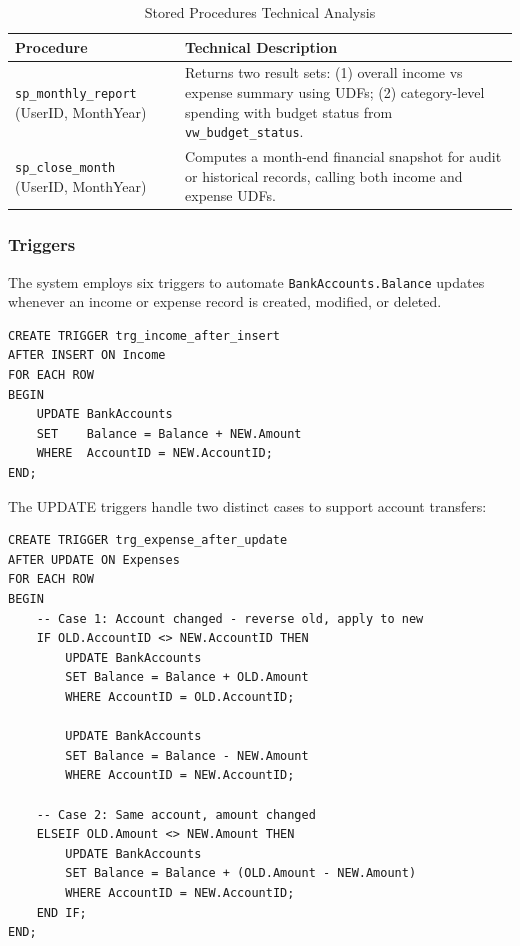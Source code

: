 \documentclass[12pt, a4paper]{article}
\begin{document}
\begin{table}[H]
\centering
\caption{Stored Procedures Technical Analysis}
\label{tab:procedures}
\begin{tabularx}{\textwidth}{>{\raggedright\arraybackslash}p{4.5cm} X}
\toprule
\textbf{Procedure} & \textbf{Technical Description} \\
\midrule
\texttt{sp\_monthly\_report} \newline \footnotesize (UserID, MonthYear)
  & Returns two result sets: (1) overall income vs expense summary using UDFs;
    (2) category-level spending with budget status from \texttt{vw\_budget\_status}. \\
\addlinespace
\texttt{sp\_close\_month} \newline \footnotesize (UserID, MonthYear)
  & Computes a month-end financial snapshot for audit or historical records,
    calling both income and expense UDFs. \\
\bottomrule
\end{tabularx}
\end{table}

\subsubsection{Triggers}

The system employs six triggers to automate \texttt{BankAccounts.Balance} updates
whenever an income or expense record is created, modified, or deleted.

\begin{lstlisting}[style=sqlstyle, caption={Trigger: trg\_income\_after\_insert}]
CREATE TRIGGER trg_income_after_insert
AFTER INSERT ON Income
FOR EACH ROW
BEGIN
    UPDATE BankAccounts
    SET    Balance = Balance + NEW.Amount
    WHERE  AccountID = NEW.AccountID;
END;
\end{lstlisting}

The UPDATE triggers handle two distinct cases to support account transfers:

\begin{lstlisting}[style=sqlstyle, caption={Trigger: trg\_expense\_after\_update -- dual-case balance adjustment}]
CREATE TRIGGER trg_expense_after_update
AFTER UPDATE ON Expenses
FOR EACH ROW
BEGIN
    -- Case 1: Account changed - reverse old, apply to new
    IF OLD.AccountID <> NEW.AccountID THEN
        UPDATE BankAccounts 
        SET Balance = Balance + OLD.Amount
        WHERE AccountID = OLD.AccountID;

        UPDATE BankAccounts 
        SET Balance = Balance - NEW.Amount
        WHERE AccountID = NEW.AccountID;

    -- Case 2: Same account, amount changed
    ELSEIF OLD.Amount <> NEW.Amount THEN
        UPDATE BankAccounts
        SET Balance = Balance + (OLD.Amount - NEW.Amount)
        WHERE AccountID = NEW.AccountID;
    END IF;
END;
\end{lstlisting}
\end{document}
